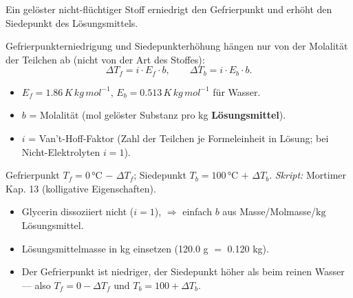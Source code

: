

Ein gelöster nicht-flüchtiger Stoff erniedrigt den Gefrierpunkt und erhöht
den Siedepunkt des Lösungsmittels.

\begin{werkzeugkasten}
Gefrierpunkterniedrigung und Siedepunkterhöhung hängen nur von der
Molalität der Teilchen ab (nicht von der Art des Stoffes):
\[
  \Delta T_f = i \cdot E_f \cdot b,\qquad
  \Delta T_b = i \cdot E_b \cdot b.
\]
\begin{itemize}
  \item $E_f=1.86\,K\,kg\,mol^{-1}$, $E_b=0.513\,K\,kg\,mol^{-1}$ für Wasser.
  \item $b$ = Molalität (mol gelöster Substanz pro kg \textbf{Lösungsmittel}).
  \item $i$ = Van't-Hoff-Faktor (Zahl der Teilchen je Formeleinheit in
        Lösung; bei Nicht-Elektrolyten $i=1$).
\end{itemize}
Gefrierpunkt $T_f = 0\,$°C $-$ $\Delta T_f$; Siedepunkt $T_b = 100\,$°C $+$
$\Delta T_b$.
\textit{Skript:} Mortimer Kap. 13 (kolligative Eigenschaften).
\end{werkzeugkasten}

\begin{achtung}
\begin{itemize}
  \item Glycerin dissoziiert nicht ($i=1$), $\Rightarrow$ einfach
        $b$ aus Masse/Molmasse/$\mathrm{kg}$ Lösungsmittel.
  \item Lösungsmittelmasse in kg einsetzen (120.0 g $=$ 0.120 kg).
  \item Der Gefrierpunkt ist niedriger, der Siedepunkt höher als beim reinen
        Wasser --- also $T_f = 0-\Delta T_f$ und $T_b = 100+\Delta T_b$.
\end{itemize}
\end{achtung}

